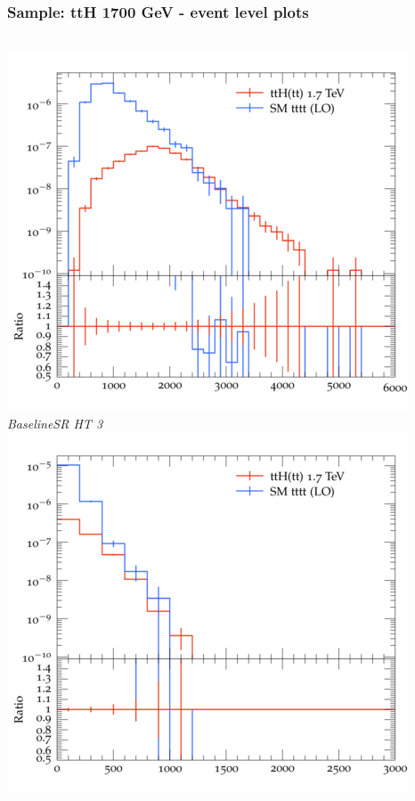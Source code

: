 \documentclass{beamer}
\begin{document}
\begin{frame}
\frametitle{Sample: ttH 1700 GeV - event level plots}
\begin{columns}
\includegraphics[width=\textwidth]{../plots/ttH_1700/tttt_ttH_1LOS/BaselineSR_HT_3.png}\\
\textit{\small BaselineSR HT 3}
\includegraphics[width=\textwidth]{../plots/ttH_1700/tttt_ttH_1LOS/BaselineSR_MET.png}\\

\end{columns}
\end{frame}
\end{document}

